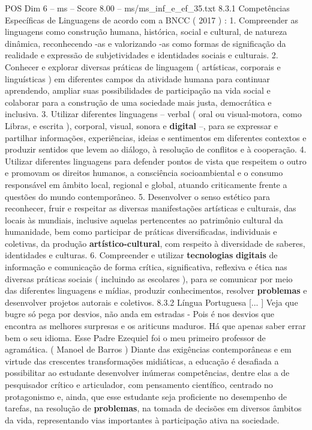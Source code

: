 \begin{textsample}{POS Dim 6 – ms – Score 8.00 – ms/ms\_inf\_e\_ef\_35.txt}  \label{ex:f6_pos_058}
8.3.1 Competências Específicas de Linguagens de acordo com a BNCC ( 2017 ) : 1.
Compreender as linguagens como construção humana, histórica, social e cultural, de natureza dinâmica, reconhecendo -as e valorizando -as como formas de significação da realidade e expressão de subjetividades e identidades sociais e culturais. 2.
Conhecer e explorar diversas práticas de linguagem ( artísticas, corporais e linguísticas ) em diferentes campos da atividade humana para continuar aprendendo, ampliar suas possibilidades de participação na vida social e colaborar para a construção de uma sociedade mais justa, democrática e inclusiva. 3.
Utilizar diferentes linguagens – verbal ( oral ou visual-motora, como Libras, e escrita ), corporal, visual, sonora e \textbf{digital} –, para se expressar e partilhar informações, experiências, ideias e sentimentos em diferentes contextos e produzir sentidos que levem ao diálogo, à resolução de conflitos e à cooperação. 4.
Utilizar diferentes linguagens para defender pontos de vista que respeitem o outro e promovam os direitos humanos, a consciência socioambiental e o consumo responsável em âmbito local, regional e global, atuando criticamente frente a questões do mundo contemporâneo. 5.
Desenvolver o senso estético para reconhecer, fruir e respeitar as diversas manifestações artísticas e culturais, das locais às mundiais, inclusive aquelas pertencentes ao patrimônio cultural da humanidade, bem como participar de práticas diversificadas, individuais e coletivas, da produção \textbf{artístico-cultural}, com respeito à diversidade de saberes, identidades e culturas. 6.
Compreender e utilizar \textbf{tecnologias} \textbf{digitais} de informação e comunicação de forma crítica, significativa, reflexiva e ética nas diversas práticas sociais ( incluindo as escolares ), para se comunicar por meio das diferentes linguagens e mídias, produzir conhecimentos, resolver \textbf{problemas} e desenvolver projetos autorais e coletivos. 8.3.2 Língua Portuguesa [... ] Veja que bugre só pega por desvios, não anda em estradas - Pois é nos desvios que encontra as melhores surpresas e os ariticuns maduros.
Há que apenas saber errar bem o seu idioma.
Esse Padre Ezequiel foi o meu primeiro professor de agramática. ( Manoel de Barros ) Diante das exigências contemporâneas e em virtude das crescentes transformações midiáticas, a educação é desafiada a possibilitar ao estudante desenvolver inúmeras competências, dentre elas a de pesquisador crítico e articulador, com pensamento científico, centrado no protagonismo e, ainda, que esse estudante seja proficiente no desempenho de tarefas, na resolução de \textbf{problemas}, na tomada de decisões em diversos âmbitos da vida, representando vias importantes à participação ativa na sociedade.

\end{textsample}
